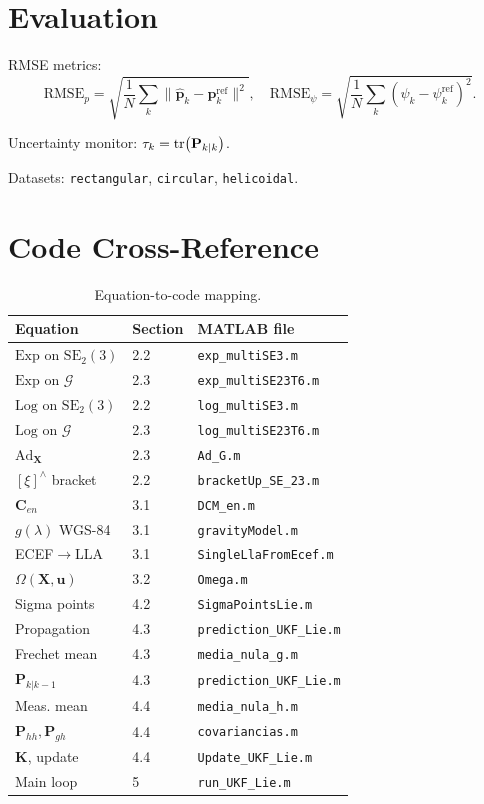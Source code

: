 \documentclass[11pt,a4paper]{article}
\theoremstyle{definition}
\theoremstyle{plain}
\newcommand{\Exp}{\mathrm{Exp}}
\newcommand{\Log}{\mathrm{Log}}
\newcommand{\Ad}{\mathrm{Ad}}
\newcommand{\bX}{\mathbf{X}}
\newcommand{\bP}{\mathbf{P}}
\newcommand{\bK}{\mathbf{K}}
\begin{document}
\section{Evaluation}

RMSE metrics:
\[
  \mathrm{RMSE}_p = \sqrt{\frac{1}{N}\sum_k\|\hat{\mathbf{p}}_k-\mathbf{p}_k^{\mathrm{ref}}\|^2},
  \quad
  \mathrm{RMSE}_\psi = \sqrt{\frac{1}{N}\sum_k(\hat\psi_k-\psi_k^{\mathrm{ref}})^2}.
\]

Uncertainty monitor: $\tau_k = \tr(\bP_{k|k})$.

Datasets: \texttt{rectangular}, \texttt{circular}, \texttt{helicoidal}.

\appendix
\section{Code Cross-Reference}

\begin{table}[h!]
\centering
\caption{Equation-to-code mapping.}
\renewcommand{\arraystretch}{1.35}
\begin{tabular}{@{}p{5cm}lp{5cm}@{}}
\toprule
Equation & Section & MATLAB file \\
\midrule
$\Exp$ on $\mathrm{SE}_2(3)$ & 2.2 & \texttt{exp\_multiSE3.m} \\
$\Exp$ on $\mathcal{G}$ & 2.3 & \texttt{exp\_multiSE23T6.m} \\
$\Log$ on $\mathrm{SE}_2(3)$ & 2.2 & \texttt{log\_multiSE3.m} \\
$\Log$ on $\mathcal{G}$ & 2.3 & \texttt{log\_multiSE23T6.m} \\
$\Ad_{\mathbf{X}}$ & 2.3 & \texttt{Ad\_G.m} \\
$[\xi]^\wedge$ bracket & 2.2 & \texttt{bracketUp\_SE\_23.m} \\
$\mathbf{C}_{en}$ & 3.1 & \texttt{DCM\_en.m} \\
$g(\lambda)$ WGS-84 & 3.1 & \texttt{gravityModel.m} \\
ECEF$\to$LLA & 3.1 & \texttt{SingleLlaFromEcef.m} \\
$\Omega(\bX,\mathbf{u})$ & 3.2 & \texttt{Omega.m} \\
Sigma points & 4.2 & \texttt{SigmaPointsLie.m} \\
Propagation & 4.3 & \texttt{prediction\_UKF\_Lie.m} \\
Frechet mean & 4.3 & \texttt{media\_nula\_g.m} \\
$\bP_{k|k-1}$ & 4.3 & \texttt{prediction\_UKF\_Lie.m} \\
Meas. mean & 4.4 & \texttt{media\_nula\_h.m} \\
$\mathbf{P}_{hh},\mathbf{P}_{gh}$ & 4.4 & \texttt{covariancias.m} \\
$\bK$, update & 4.4 & \texttt{Update\_UKF\_Lie.m} \\
Main loop & 5 & \texttt{run\_UKF\_Lie.m} \\
\bottomrule
\end{tabular}
\end{table}
\end{document}
